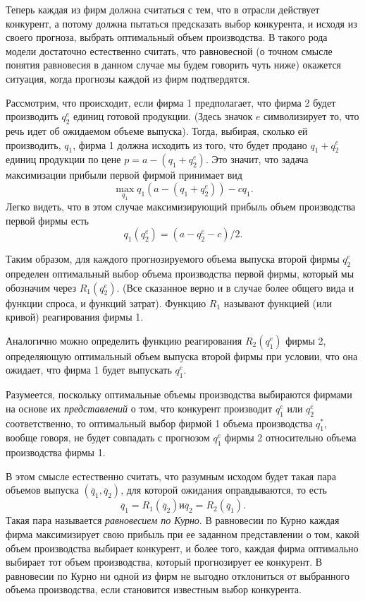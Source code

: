 Теперь каждая из фирм должна считаться с тем, что в отрасли действует
конкурент, а потому должна пытаться предсказать выбор конкурента, и
исходя из своего прогноза, выбрать оптимальный объем производства. В
такого рода модели достаточно естественно считать, что равновесной
(о точном смысле понятия равновесия в данном случае мы будем говорить
чуть ниже) окажется ситуация, когда прогнозы каждой из фирм подтвердятся.

Рассмотрим, что происходит, если фирма 1 предполагает, что фирма 2
будет производить $q^e_2$ единиц готовой продукции. (Здесь значок $e$
символизирует то, что речь идет об ожидаемом объеме выпуска). Тогда, выбирая,
сколько ей производить, $q_1$, фирма 1 должна исходить из того, что
будет продано $q_1 + q^e_2$ единиц продукции по цене $p=a-(q_1 +
q^e_2)$. Это значит, что задача максимизации прибыли первой фирмой
принимает вид
$$
\max_{q_1}q_1(a-(q_1 + q^e_2))-cq_1.
$$
Легко видеть, что в этом случае максимизирующий прибыль объем
производства первой фирмы есть
$$
q_1(q^e_2)=(a-q^e_2-c)/2.
$$

Таким образом, для каждого прогнозируемого объема выпуска второй
фирмы  $q^e_2$ определен оптимальный выбор объема производства
первой фирмы, который мы обозначим через $R_1(q^e_2)$. (Все
сказанное верно и в случае более общего вида и функции спроса, и
функций затрат). Функцию $R_1$ называют функцией (или кривой)
реагирования фирмы 1.

Аналогично можно определить функцию реагирования $R_2(q^e_1)$ фирмы
2, определяющую оптимальный объем выпуска второй фирмы при условии,
что она ожидает, что фирма 1 будет выпускать $q^e_1$.

Разумеется, поскольку оптимальные объемы производства выбираются
фирмами на основе их \emph{представлений} о том, что конкурент
производит $q^e_1$ или $q^e_2$ соответственно, то оптимальный выбор
фирмой 1 объема производства $q^*_1$, вообще говоря, не будет
совпадать с прогнозом $q^e_1$ фирмы 2 относительно объема производства
фирмы 1.

В этом смысле естественно считать, что разумным исходом будет такая
пара объемов выпуска $(\overline{q}_1, \overline{q}_2)$, для которой
ожидания оправдываются, то есть
$$
\overline{q}_1=R_1(\overline{q}_2) \text{и}
\overline{q}_2=R_2(\overline{q}_1). $$ Такая пара называется
\emph{равновесием по Курно}. В равновесии по Курно каждая фирма
максимизирует свою прибыль при ее заданном представлении о том,
какой объем производства выбирает конкурент, и более того, каждая
фирма оптимально выбирает тот объем производства, который
прогнозирует ее конкурент. В равновесии по Курно ни одной из фирм не
выгодно отклониться от выбранного объема производства, если
становится известным выбор конкурента.

